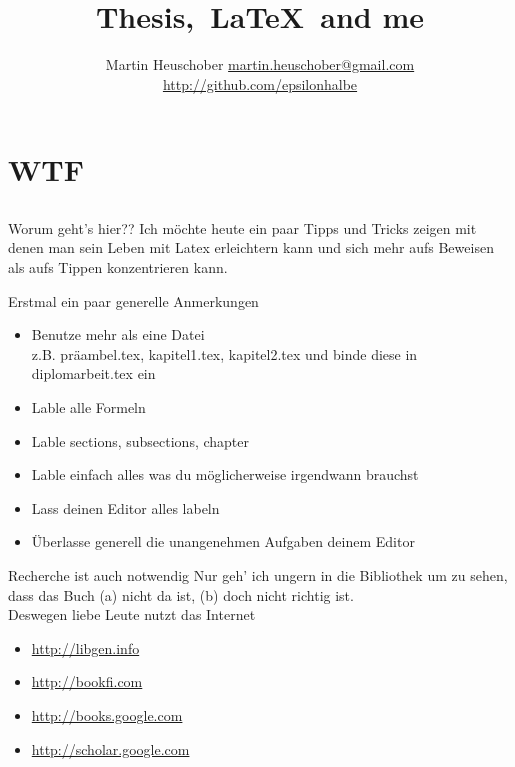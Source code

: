 \documentclass{beamer}
\title{Thesis,~\LaTeX~and me}
\author{\texorpdfstring{Martin Heuschober\newline
        \href{mailto:martin.heuschober@gmail.com}{martin.heuschober@gmail.com}\newline
        \href{http://github.com/epsilonhalbe/Thesis_Latex_and_me}{http://github.com/epsilonhalbe}}
        {Martin Heuschober}}
\begin{document}
\begin{frame}
    \titlepage
\end{frame}

\begin{frame}
    \tableofcontents
\end{frame}

\section{WTF}
\label{sec:wtf}

\subsection{}
\begin{frame}{Worum geht's hier??}
    Ich möchte heute ein paar Tipps und Tricks zeigen mit denen man sein Leben mit
    Latex erleichtern kann und sich mehr aufs Beweisen als aufs Tippen
    konzentrieren kann.
\end{frame}

\begin{frame}{Erstmal ein paar generelle Anmerkungen}
    \begin{itemize}
        \item Benutze mehr als eine Datei\\
              z.B. präambel.tex, kapitel1.tex, kapitel2.tex und binde diese in
              diplomarbeit.tex ein
        \item Lable alle Formeln
        \item Lable sections, subsections, chapter
        \item Lable einfach alles was du möglicherweise irgendwann brauchst
        \item Lass deinen Editor alles labeln
        \item Überlasse generell die unangenehmen Aufgaben deinem Editor
    \end{itemize}
\end{frame}

\begin{frame}{Recherche ist auch notwendig}
    Nur geh' ich ungern in die Bibliothek um zu sehen, dass das Buch (a) nicht
    da ist, (b) doch nicht richtig ist.\\
    Deswegen liebe Leute nutzt das Internet
    \begin{itemize}
        \item \url{http://libgen.info}
        \item \url{http://bookfi.com}
        \item \url{http://books.google.com}
        \item \url{http://scholar.google.com}
    \end{itemize}
\end{frame}
\end{document}
